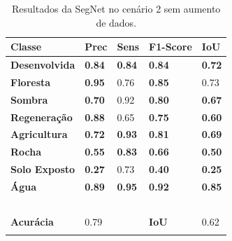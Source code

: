 \documentclass[%
  10pt,%
  aspectratio = 169,%
  compress,%
  t,%
  english,%
  brazilian,%
  tikz,
]{beamer}
\begin{document}
\begin{frame}
\begin{columns}[T]
\begin{table}[!ht]
    \centering
    \caption{Resultados da SegNet no cenário 2 sem aumento de dados.}%
    \label{tab:res:cen22}%
    \begin{tabular}{lllll}
    \toprule
        \textbf{Classe} & \textbf{Prec} & \textbf{Sens} & \textbf{F1-Score} & \textbf{IoU} \\
        \midrule
        \textbf{Desenvolvida}    & \textbf{0.84} & \textbf{0.84} & \textbf{0.84} & \textbf{0.72}  \\ 
        \textbf{Floresta}        & \textbf{0.95} & 0.76 & \textbf{0.85} & 0.73  \\ 
        \textbf{Sombra}          & \textbf{0.70} & 0.92 & \textbf{0.80} & \textbf{0.67}  \\ 
        \textbf{Regeneração}     & \textbf{0.88} & 0.65 & \textbf{0.75} & \textbf{0.60}  \\ 
        \textbf{Agricultura}     & \textbf{0.72} & \textbf{0.93} & \textbf{0.81} & \textbf{0.69}  \\ 
        \textbf{Rocha}           & \textbf{0.55} & \textbf{0.83} & \textbf{0.66} & \textbf{0.50}  \\ 
        \textbf{Solo Exposto}    & \textbf{0.27} & 0.73 & \textbf{0.40} & \textbf{0.25}  \\ 
        \textbf{Água}            & \textbf{0.89} & \textbf{0.95} & \textbf{0.92} & \textbf{0.85} \\ 
        \textbf{} & ~ & ~ & ~ & ~ \\ 
        \textbf{Acurácia} & 0.79 & ~ & \textbf{IoU} & 0.62 \\
        \bottomrule
        \addlinespace
    \end{tabular}
\end{table}

\end{columns}
\end{frame}
\end{document}
